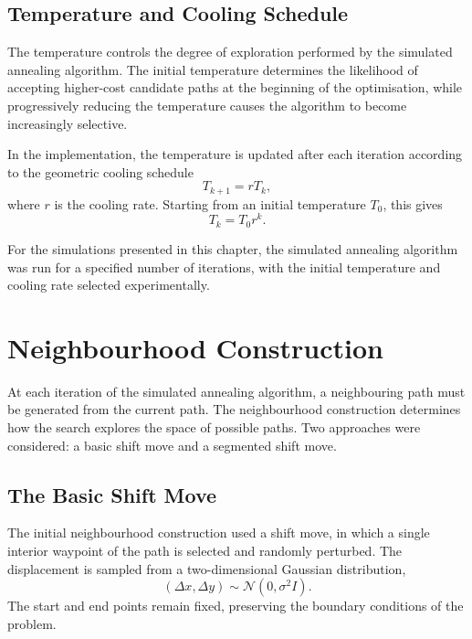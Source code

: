 \subsection{Temperature and Cooling Schedule}
\label{subsec:temperature_cooling}

The temperature controls the degree of exploration performed by the
simulated annealing algorithm. The initial temperature determines the
likelihood of accepting higher-cost candidate paths at the beginning
of the optimisation, while progressively reducing the temperature
causes the algorithm to become increasingly selective.

In the implementation, the temperature is updated after each iteration
according to the geometric cooling schedule
\begin{equation}
T_{k+1}=rT_k,
\label{eq:cooling_schedule}
\end{equation}
where $r$ is the cooling rate. Starting from an initial temperature
$T_0$, this gives
\begin{equation}
T_k=T_0r^k.
\end{equation}

For the simulations presented in this chapter, the simulated annealing
algorithm was run for a specified number of iterations, with the
initial temperature and cooling rate selected experimentally.


\section{Neighbourhood Construction}
\label{sec:neighbourhood_construction}

At each iteration of the simulated annealing algorithm, a neighbouring
path must be generated from the current path. The neighbourhood
construction determines how the search explores the space of possible
paths. Two approaches were considered: a basic shift move and a
segmented shift move.

\subsection{The Basic Shift Move}
\label{subsec:shift_move}

The initial neighbourhood construction used a shift move, in which a
single interior waypoint of the path is selected and randomly
perturbed. The displacement is sampled from a two-dimensional Gaussian
distribution,
\[
(\Delta x,\Delta y)\sim\mathcal{N}(0,\sigma^2 I).
\]
The start and end points remain fixed, preserving the boundary
conditions of the problem.

